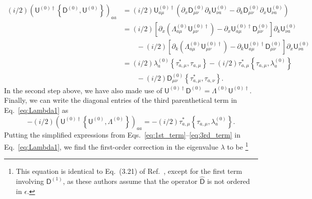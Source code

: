 \begin{equation}
  \begin{aligned}
    (i/2)\left(\mathsf{U}^{(0)\dagger}  \left\{\mathsf{D}^{(0)}, \mathsf{U}^{(0)}\right\}\right)_{aa} &= (i/2)\mathsf{U}^{(0)\dagger}_{a\mu}\left(\partial_{x}\mathsf{D}^{(0)}_{\mu\nu}\partial_{k}\mathsf{U}^{(0)}_{\nu a} - \partial_{k}\mathsf{D}^{(0)}_{\mu\nu}\partial_{x}\mathsf{U}_{\nu a}^{(0)}\right)\\
                                                                                                                  &=  (i/2)\left[\partial_{x}\left(\Lambda^{(0)}_{a\mu}\mathsf{U}^{(0)\dagger}_{\mu\nu}\right) - \partial_{x}\mathsf{U}^{(0)\dagger}_{a\mu}\mathsf{D}^{(0)}_{\mu\nu}\right]\partial_{k}\mathsf{U}_{\nu a}^{(0)}\\
                                                                                                                    &\phantom{}\qquad - (i/2)\left[\partial_{k}\left(\Lambda^{(0)}_{a\mu}\mathsf{U}^{(0)\dagger}_{\mu\nu}\right) - \partial_{k}\mathsf{U}^{(0)\dagger}_{a\mu}\mathsf{D}^{(0)}_{\mu\nu}\right]\partial_{x}\mathsf{U}_{\nu a}^{(0)}\\
                                                                                                                      &= (i/2)\lambda^{(0)}_{a}\left\{\tau_{a,\mu}^{*}, \tau_{a,\mu}\right\} - (i/2)\tau_{a,\mu}^{*}\left\{\tau_{a,\mu},\lambda^{(0)}_{a}\right\}\\
                                                                                                                        &\phantom{}\qquad - (i/2)\mathsf{D}^{(0)}_{\mu\nu}\left\{\tau_{a,\mu}^{*}, \tau_{a,\nu}\right\}.
  \end{aligned}
  \label{eq:2nd_term}
\end{equation}
%
In the second step above, we have also made use of $\mathsf{U}^{(0)\dagger}\mathsf{D}^{(0)} = \Lambda^{(0)}\mathsf{U}^{(0)\dagger}$.
Finally, we can write the diagonal entries of the third parenthetical term in Eq.~\eqref{eq:Lambda1} as
%
\begin{equation}
  -(i/2)\left(\mathsf{U}^{(0)\dagger}\left\{\mathsf{U}^{(0)}, \Lambda^{(0)}\right\}\right)_{aa} = -(i/2)\tau_{a,\mu}^{*}\left\{\tau_{a,\mu},\lambda_{a}^{(0)}\right\}.
  \label{eq:3rd_term}
\end{equation}
%
Putting the simplified expressions from Eqs.~\eqref{eq:1st_term}--\eqref{eq:3rd_term} in Eq.~\eqref{eq:Lambda1}, we find the first-order correction in the eigenvalue $\lambda$ to be%
\footnote{This equation is identical to Eq.~(3.21) of Ref.~\cite{littlejohn1991a}, except for the first term involving $\mathsf{D}^{(1)}$, as these authors assume that the operator $\widehat{\mathsf{D}}$ is not ordered in $\epsilon$.}
